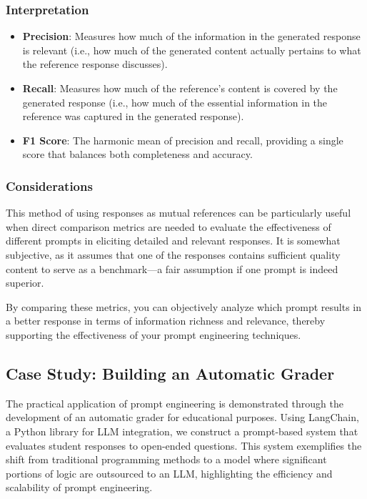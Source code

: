 \documentclass[
]{agujournal2019}
\providecommand{\tightlist}{%
  \setlength{\itemsep}{0pt}\setlength{\parskip}{0pt}}\usepackage{longtable,booktabs,array}
\begin{document}
\subsubsection{Interpretation}\label{interpretation}

\begin{itemize}
\tightlist
\item
  \textbf{Precision}: Measures how much of the information in the
  generated response is relevant (i.e., how much of the generated
  content actually pertains to what the reference response discusses).
\item
  \textbf{Recall}: Measures how much of the reference's content is
  covered by the generated response (i.e., how much of the essential
  information in the reference was captured in the generated response).
\item
  \textbf{F1 Score}: The harmonic mean of precision and recall,
  providing a single score that balances both completeness and accuracy.
\end{itemize}

\subsubsection{Considerations}\label{considerations}

This method of using responses as mutual references can be particularly
useful when direct comparison metrics are needed to evaluate the
effectiveness of different prompts in eliciting detailed and relevant
responses. It is somewhat subjective, as it assumes that one of the
responses contains sufficient quality content to serve as a
benchmark---a fair assumption if one prompt is indeed superior.

By comparing these metrics, you can objectively analyze which prompt
results in a better response in terms of information richness and
relevance, thereby supporting the effectiveness of your prompt
engineering techniques.

\subsection{Case Study: Building an Automatic
Grader}\label{case-study-building-an-automatic-grader}

The practical application of prompt engineering is demonstrated through
the development of an automatic grader for educational purposes. Using
LangChain, a Python library for LLM integration, we construct a
prompt-based system that evaluates student responses to open-ended
questions. This system exemplifies the shift from traditional
programming methods to a model where significant portions of logic are
outsourced to an LLM, highlighting the efficiency and scalability of
prompt engineering.
\end{document}
